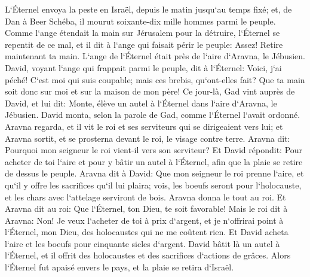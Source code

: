 \verse L`Éternel envoya la peste en Israël, depuis le matin jusqu`au temps fixé; et, de Dan à Beer Schéba, il mourut soixante-dix mille hommes parmi le peuple. 
\verse Comme l`ange étendait la main sur Jérusalem pour la détruire, l`Éternel se repentit de ce mal, et il dit à l`ange qui faisait périr le peuple: Assez! Retire maintenant ta main. L`ange de l`Éternel était près de l`aire d`Aravna, le Jébusien. 
\verse David, voyant l`ange qui frappait parmi le peuple, dit à l`Éternel: Voici, j`ai péché! C`est moi qui suis coupable; mais ces brebis, qu`ont-elles fait? Que ta main soit donc sur moi et sur la maison de mon père! 
\verse Ce jour-là, Gad vint auprès de David, et lui dit: Monte, élève un autel à l`Éternel dans l`aire d`Aravna, le Jébusien. 
\verse David monta, selon la parole de Gad, comme l`Éternel l`avait ordonné. 
\verse Aravna regarda, et il vit le roi et ses serviteurs qui se dirigeaient vers lui; et Aravna sortit, et se prosterna devant le roi, le visage contre terre. 
\verse Aravna dit: Pourquoi mon seigneur le roi vient-il vers son serviteur? Et David répondit: Pour acheter de toi l`aire et pour y bâtir un autel à l`Éternel, afin que la plaie se retire de dessus le peuple. 
\verse Aravna dit à David: Que mon seigneur le roi prenne l`aire, et qu`il y offre les sacrifices qu`il lui plaira; vois, les boeufs seront pour l`holocauste, et les chars avec l`attelage serviront de bois. 
\verse Aravna donna le tout au roi. Et Aravna dit au roi: Que l`Éternel, ton Dieu, te soit favorable! 
\verse Mais le roi dit à Aravna: Non! Je veux l`acheter de toi à prix d`argent, et je n`offrirai point à l`Éternel, mon Dieu, des holocaustes qui ne me coûtent rien. Et David acheta l`aire et les boeufs pour cinquante sicles d`argent. 
\verse David bâtit là un autel à l`Éternel, et il offrit des holocaustes et des sacrifices d`actions de grâces. Alors l`Éternel fut apaisé envers le pays, et la plaie se retira d`Israël. 
